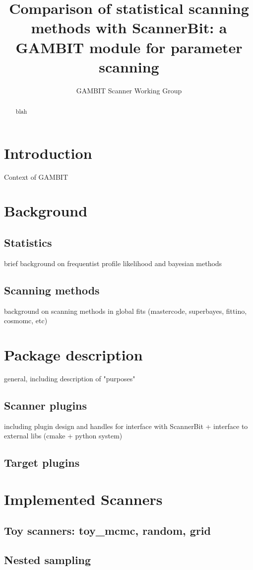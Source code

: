 \documentclass[11pt,a4paper]{article}
\title{Comparison of statistical scanning methods with ScannerBit: a GAMBIT module for parameter scanning}
\author{GAMBIT Scanner Working Group}
\begin{document}
\maketitle

\begin{abstract}
blah
\end{abstract}

\section{Introduction}
Context of GAMBIT

\section{Background}
\subsection{Statistics}
brief background on frequentist profile likelihood and bayesian methods 
\subsection{Scanning methods}
background on scanning methods in global fits (mastercode, superbayes, fittino, cosmomc, etc)

\section{Package description}
general, including description of "purposes"
\subsection{Scanner plugins}
including plugin design and handles for interface with ScannerBit + interface to external libs (cmake + python system)
\subsection{Target plugins}

\section{Implemented Scanners}
\subsection{Toy scanners: toy\_mcmc, random, grid}
\subsection{Nested sampling}
\end{document}
